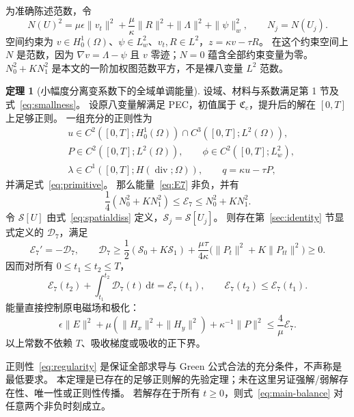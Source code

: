 \documentclass[UTF8,a4paper,11pt,fontset=none]{ctexart}
\numberwithin{equation}{section}
\theoremstyle{definition}
\newtheorem{theorem}{定理}[section]
\theoremstyle{definition}
\newcommand{\Om}{\Omega}
\newcommand{\eps}{\epsilon}
\newcommand{\dd}{\,\mathrm d}
\newcommand{\Ecal}{\mathcal E}
\newcommand{\Dcal}{\mathcal D}
\newcommand{\Sc}{\mathscr S}
\DeclareMathOperator{\diver}{div}
\begin{document}
为准确陈述范数，令
\begin{equation}\label{eq:N}
 N(U)^2=\mu\eps\|v_t\|^2+\frac\mu\kappa\|R\|^2
 +\|\Lambda\|^2+\|\psi\|_w^2,\qquad N_j=N(U_j).
\end{equation}
空间约束为 $v\in H_0^1(\Om)$、$\psi\in L_w^2$、$v_t,R\in L^2$，$z=\kappa v-\tau R$。
在这个约束空间上 $N$ 是范数，因为 $\nabla v=\Lambda-\psi$ 且 $v$ 零迹；$N=0$ 蕴含全部约束变量为零。
$N_0^2+KN_1^2$ 是本文的一阶加权图范数平方，不是裸八变量 $L^2$ 范数。

\begin{theorem}[小幅度分离变系数下的全域单调能量]\label{thm:main}
设域、材料与系数满足第 1 节及式~\eqref{eq:smallness}。
设原八变量解满足 PEC，初值属于 $\mathfrak C_c$，提升后的解在 $[0,T]$ 上足够正则。
一组充分的正则性为
\begin{equation}\label{eq:regularity}
\begin{aligned}
 &u\in C^2([0,T];H_0^1(\Om))\cap C^3([0,T];L^2(\Om)),\\
 &P\in C^2([0,T];L^2(\Om)),\qquad
 \phi\in C^2([0,T];L_w^2),\\
 &\lambda\in C^1([0,T];H(\diver;\Om)),
 \qquad q=\kappa u-\tau P,
\end{aligned}
\end{equation}
并满足式~\eqref{eq:primitive}。
那么能量~\eqref{eq:E7} 非负，并有
\begin{equation}\label{eq:equivalence}
 \frac14(N_0^2+KN_1^2)\le\Ecal_7\le N_0^2+KN_1^2.
\end{equation}
令 $\Sc[U]$ 由式~\eqref{eq:spatialdiss} 定义，$\Sc_j=\Sc[U_j]$。
则存在第~\ref{sec:identity} 节显式定义的 $\Dcal_7$，满足
\begin{equation}\label{eq:main-diss}
 \Ecal_7'=-\Dcal_7,\qquad
 \Dcal_7\ge\frac12(\Sc_0+K\Sc_1)
 +\frac{\mu\tau}{4\kappa}\big(\|P_t\|^2+K\|P_{tt}\|^2\big)\ge0.
\end{equation}
因而对所有 $0\le t_1\le t_2\le T$，
\begin{equation}\label{eq:main-balance}
 \Ecal_7(t_2)+\int_{t_1}^{t_2}\Dcal_7(t)\dd t=\Ecal_7(t_1),
 \qquad \Ecal_7(t_2)\le\Ecal_7(t_1).
\end{equation}
能量直接控制原电磁场和极化：
\begin{equation}\label{eq:physicalcontrol}
 \eps\|E\|^2+\mu(\|H_x\|^2+\|H_y\|^2)+\kappa^{-1}\|P\|^2
 \le\frac4\mu\Ecal_7.
\end{equation}
以上常数不依赖 $T$、吸收梯度或吸收的正下界。
\end{theorem}

正则性~\eqref{eq:regularity} 是保证全部求导与 Green 公式合法的充分条件，不声称是最低要求。
本定理是已存在的足够正则解的先验定理；未在这里另证强解/弱解存在性、唯一性或正则性传播。
若解存在于所有 $t\ge0$，则式~\eqref{eq:main-balance} 对任意两个非负时刻成立。
\end{document}
